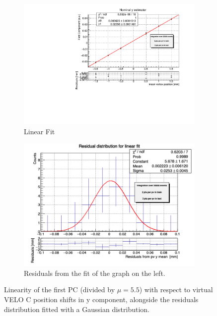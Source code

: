 \begin{samepage}
\begin{figure}
    \label{fig:x_veloC_MC}
\end{figure}
\begin{figure}
    \centering
    \begin{subfigure}{0.48\textwidth}
    \includegraphics[width=\linewidth]{figures/y_fit_veloC_MC_normalised.pdf}
    \caption{Linear Fit}\label{fig:y_veloC_fit_MC}
    \end{subfigure}
    \begin{subfigure}{0.48\textwidth}
    \includegraphics[width=\linewidth]{figures/y_res_veloC_MC.png}
    \caption{Residuals from the fit of the graph on the left. }\label{fig:y_veloC_res_MC}
    \end{subfigure}
    \caption{Linearity of the first PC (divided by $\mu=5.5$) with respect to  virtual VELO C position shifts in y component, alongside the residuals distribution fitted with a Gaussian distribution.}

\end{figure}
\end{samepage}
